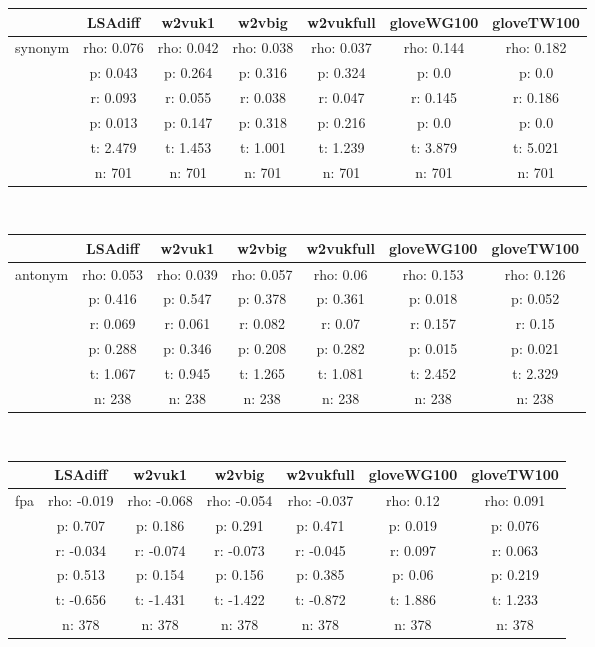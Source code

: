 \documentclass{article}
\begin{document}
\begin{tabular}{ccccccc|}\cline{2-7}
&\multicolumn{1}{|c}{LSAdiff} & w2vuk1 & w2vbig & w2vukfull & gloveWG100 & gloveTW100 \\\hline
\multicolumn{1}{|c|}{\multirow{6}{*}{synonym}} & rho: 0.076 & rho: 0.042 & rho: 0.038 & rho: 0.037 & rho: 0.144 & rho: 0.182 \\
\multicolumn{1}{|c|}{} & p: 0.043 & p: 0.264 & p: 0.316 & p: 0.324 & p: 0.0 & p: 0.0 \\
\multicolumn{1}{|c|}{} & r: 0.093 & r: 0.055 & r: 0.038 & r: 0.047 & r: 0.145 & r: 0.186 \\
\multicolumn{1}{|c|}{} & p: 0.013 & p: 0.147 & p: 0.318 & p: 0.216 & p: 0.0 & p: 0.0 \\
\multicolumn{1}{|c|}{} & t: 2.479 & t: 1.453 & t: 1.001 & t: 1.239 & t: 3.879 & t: 5.021 \\
\multicolumn{1}{|c|}{} & n: 701 & n: 701 & n: 701 & n: 701 & n: 701 & n: 701 \\
\hline
\end{tabular}\\
\begin{tabular}{ccccccc|}\cline{2-7}
&\multicolumn{1}{|c}{LSAdiff} & w2vuk1 & w2vbig & w2vukfull & gloveWG100 & gloveTW100 \\\hline
\multicolumn{1}{|c|}{\multirow{6}{*}{antonym}} & rho: 0.053 & rho: 0.039 & rho: 0.057 & rho: 0.06 & rho: 0.153 & rho: 0.126 \\
\multicolumn{1}{|c|}{} & p: 0.416 & p: 0.547 & p: 0.378 & p: 0.361 & p: 0.018 & p: 0.052 \\
\multicolumn{1}{|c|}{} & r: 0.069 & r: 0.061 & r: 0.082 & r: 0.07 & r: 0.157 & r: 0.15 \\
\multicolumn{1}{|c|}{} & p: 0.288 & p: 0.346 & p: 0.208 & p: 0.282 & p: 0.015 & p: 0.021 \\
\multicolumn{1}{|c|}{} & t: 1.067 & t: 0.945 & t: 1.265 & t: 1.081 & t: 2.452 & t: 2.329 \\
\multicolumn{1}{|c|}{} & n: 238 & n: 238 & n: 238 & n: 238 & n: 238 & n: 238 \\
\hline
\end{tabular}\\
\begin{tabular}{ccccccc|}\cline{2-7}
&\multicolumn{1}{|c}{LSAdiff} & w2vuk1 & w2vbig & w2vukfull & gloveWG100 & gloveTW100 \\\hline
\multicolumn{1}{|c|}{\multirow{6}{*}{fpa}} & rho: -0.019 & rho: -0.068 & rho: -0.054 & rho: -0.037 & rho: 0.12 & rho: 0.091 \\
\multicolumn{1}{|c|}{} & p: 0.707 & p: 0.186 & p: 0.291 & p: 0.471 & p: 0.019 & p: 0.076 \\
\multicolumn{1}{|c|}{} & r: -0.034 & r: -0.074 & r: -0.073 & r: -0.045 & r: 0.097 & r: 0.063 \\
\multicolumn{1}{|c|}{} & p: 0.513 & p: 0.154 & p: 0.156 & p: 0.385 & p: 0.06 & p: 0.219 \\
\multicolumn{1}{|c|}{} & t: -0.656 & t: -1.431 & t: -1.422 & t: -0.872 & t: 1.886 & t: 1.233 \\
\multicolumn{1}{|c|}{} & n: 378 & n: 378 & n: 378 & n: 378 & n: 378 & n: 378 \\
\hline
\end{tabular}\\
\end{document}
